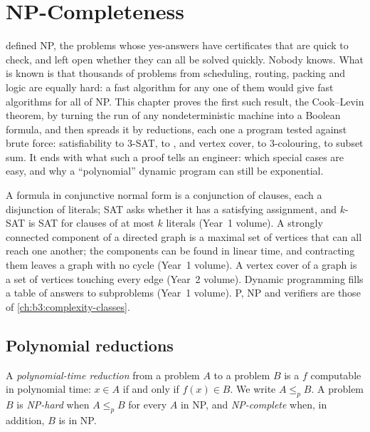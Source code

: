 \chapter{NP-Completeness}\label{ch:b3:np-completeness}

 defined NP, the problems whose yes-answers have certificates that are quick to check, and left open whether they can all be solved quickly. Nobody knows. What is known is that thousands of problems from scheduling, routing, packing and logic are equally hard: a fast algorithm for any one of them would give fast algorithms for all of NP. This chapter proves the first such result, the Cook--Levin theorem, by turning the run of any nondeterministic machine into a Boolean formula, and then spreads it by reductions, each one a program tested against brute force: satisfiability to 3-SAT, to ,  and vertex cover, to 3-colouring, to subset sum. It ends with what such a proof tells an engineer: which special cases are easy, and why a ``polynomial'' dynamic program can still be exponential.

\begin{recall}
A formula in conjunctive normal form is a conjunction of clauses, each a disjunction of literals; SAT asks whether it has a satisfying assignment, and $k$-SAT is SAT for clauses of at most $k$ literals (Year~1 volume). A strongly connected component of a directed graph is a maximal set of vertices that can all reach one another; the components can be found in linear time, and contracting them leaves a graph with no cycle (Year~1 volume). A vertex cover of a graph is a set of vertices touching every edge (Year~2 volume). Dynamic programming fills a table of answers to subproblems (Year~1 volume). P, NP and verifiers are those of \cref{ch:b3:complexity-classes}.
\end{recall}

\section{Polynomial reductions}\label{sec:b3:np-completeness:reductions}

\begin{definition}\label{def:b3:np-completeness:reduction}
A \emph{polynomial-time reduction} from a problem $A$ to a problem $B$ is a  $f$ computable in polynomial time: $x \in A$ if and only if $f(x) \in B$. We write $A \le_p B$. A problem $B$ is \emph{NP-hard} when $A \le_p B$ for every $A$ in NP, and \emph{NP-complete} when, in addition, $B$ is in NP.
\end{definition}

